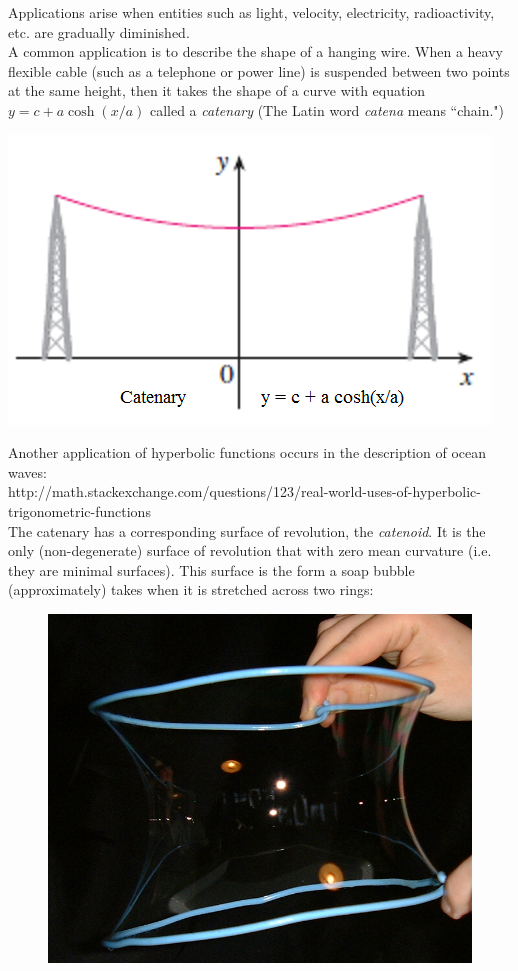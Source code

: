 
\begin{frame} 
Applications arise when entities such as light, velocity, electricity, radioactivity, etc. are gradually diminished.\\
A common application is to describe the shape of a hanging wire. When a heavy flexible cable (such as a telephone or power line) is suspended between two points at the same height, then it takes the shape of a curve with equation $ y=c+a\cosh(x/a) $ called a \textit{catenary}  (The Latin word \textit{catena} means ``chain.")\\
\begin{center}
\includegraphics[width=0.35\linewidth]{../../modules/hyperbolic-functions/pictures/catenary}
\end{center}
\end{frame}

\begin{frame} 
Another application of hyperbolic functions occurs in the description of ocean waves:\\
http://math.stackexchange.com/questions/123/real-world-uses-of-hyperbolic-trigonometric-functions \\
The catenary has a corresponding surface of revolution, the \textit{catenoid}. It is the only (non-degenerate) surface of revolution that with zero mean curvature (i.e. they are minimal surfaces). This surface is the form a soap bubble (approximately) takes when it is stretched across two rings:

\begin{figure}
\centering
\includegraphics[width=0.5\linewidth]{../../modules/hyperbolic-functions/pictures/catenoide}
\end{figure}

\end{frame}
